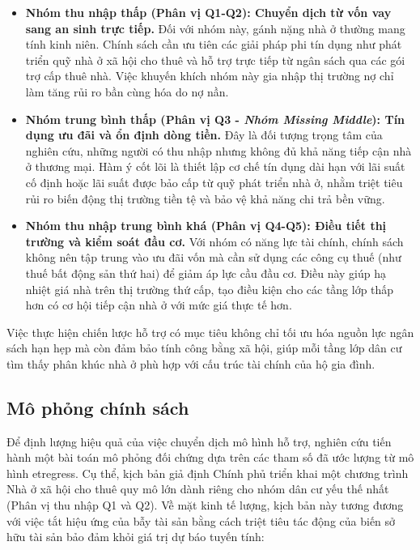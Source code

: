 \documentclass[12pt,a4paper]{report}
\begin{document}
\begin{itemize}
	\item \textbf{Nhóm thu nhập thấp (Phân vị Q1-Q2): Chuyển dịch từ vốn vay sang an sinh trực tiếp.} Đối với nhóm này, gánh nặng nhà ở thường mang tính kinh niên. Chính sách cần ưu tiên các giải pháp phi tín dụng như phát triển quỹ nhà ở xã hội cho thuê và hỗ trợ trực tiếp từ ngân sách qua các gói trợ cấp thuê nhà. Việc khuyến khích nhóm này gia nhập thị trường nợ chỉ làm tăng rủi ro bần cùng hóa do nợ nần.
	
	\item \textbf{Nhóm trung bình thấp (Phân vị Q3 - \textit{Nhóm Missing Middle}): Tín dụng ưu đãi và ổn định dòng tiền.} Đây là đối tượng trọng tâm của nghiên cứu, những người có thu nhập nhưng không đủ khả năng tiếp cận nhà ở thương mại. Hàm ý cốt lõi là thiết lập cơ chế tín dụng dài hạn với lãi suất cố định  hoặc lãi suất được bảo cấp từ quỹ phát triển nhà ở, nhằm triệt tiêu rủi ro biến động thị trường tiền tệ và bảo vệ khả năng chi trả bền vững.
	
	\item \textbf{Nhóm thu nhập trung bình khá (Phân vị Q4-Q5): Điều tiết thị trường và kiểm soát đầu cơ.} Với nhóm có năng lực tài chính, chính sách không nên tập trung vào ưu đãi vốn mà cần sử dụng các công cụ thuế (như thuế bất động sản thứ hai) để giảm áp lực cầu đầu cơ. Điều này giúp hạ nhiệt giá nhà trên thị trường thứ cấp, tạo điều kiện cho các tầng lớp thấp hơn có cơ hội tiếp cận nhà ở với mức giá thực tế hơn.
\end{itemize}

Việc thực hiện chiến lược hỗ trợ có mục tiêu không chỉ tối ưu hóa nguồn lực ngân sách hạn hẹp mà còn đảm bảo tính công bằng xã hội, giúp mỗi tầng lớp dân cư tìm thấy phân khúc nhà ở phù hợp với cấu trúc tài chính của hộ gia đình.

\subsection{Mô phỏng chính sách}

Để định lượng hiệu quả của việc chuyển dịch mô hình hỗ trợ, nghiên cứu tiến hành một bài toán mô phỏng đối chứng dựa trên các tham số đã ước lượng từ mô hình etregress. Cụ thể, kịch bản giả định Chính phủ triển khai một chương trình Nhà ở xã hội cho thuê quy mô lớn dành riêng cho nhóm dân cư yếu thế nhất (Phân vị thu nhập Q1 và Q2). Về mặt kinh tế lượng, kịch bản này tương đương với việc tắt hiệu ứng của bẫy tài sản bằng cách triệt tiêu tác động của biến sở hữu tài sản bảo đảm khỏi giá trị dự báo tuyến tính:
\end{document}
